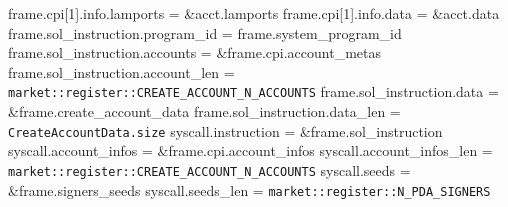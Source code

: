 \begin{algorithm}
\begin{algorithmic}
  \STATE frame.cpi[1].info.lamports = \&acct.lamports
  \STATE frame.cpi[1].info.data = \&acct.data
  \STATE frame.sol\_instruction.program\_id = frame.system\_program\_id
  \STATE frame.sol\_instruction.accounts = \&frame.cpi.account\_metas
  \STATE frame.sol\_instruction.account\_len =
    \texttt{market::register::CREATE\_ACCOUNT\_N\_ACCOUNTS}
  \STATE frame.sol\_instruction.data = \&frame.create\_account\_data
  \STATE frame.sol\_instruction.data\_len = \texttt{CreateAccountData.size}
  \STATE syscall.instruction = \&frame.sol\_instruction
  \STATE syscall.account\_infos = \&frame.cpi.account\_infos
  \STATE syscall.account\_infos\_len =
    \texttt{market::register::CREATE\_ACCOUNT\_N\_ACCOUNTS}
  \STATE syscall.seeds = \&frame.signers\_seeds
  \STATE syscall.seeds\_len = \texttt{market::register::N\_PDA\_SIGNERS}
  \STATE {}
\ENDPROCEDURE
\end{algorithmic}
\end{algorithm}
